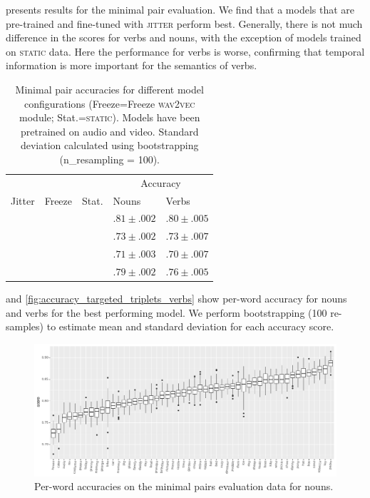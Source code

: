 presents results for the minimal pair 
evaluation. We find that a models that are 
pre-trained and fine-tuned with \textsc{jitter} perform best. Generally, there 
is not much difference in the scores for verbs and nouns, with the exception of 
models trained on \textsc{static} data. Here the performance for verbs is 
worse, confirming that temporal information is more important for the semantics 
of verbs.
\begin{table}[htb]
	\centering
	\begin{tabular}{lllll}
		\toprule
		& & & \multicolumn{2}{c}{Accuracy} \\
		Jitter & Freeze & Stat. & Nouns & Verbs \\
		\midrule
		\checkmark &  &  & $.81 \pm .002$  & $.80 \pm .005$ \\
		 &  &  & $.73 \pm .002$ & $.73 \pm .007$  \\
		\checkmark & \checkmark &  & $.71 \pm .003$ & $.70 \pm .007$ \\
		\checkmark &  &  \checkmark & $.79 \pm .002$ & $.76 \pm .005$ \\
		\bottomrule
	\end{tabular}
	\caption{Minimal pair accuracies for different model configurations 
	(Freeze=Freeze \textsc{wav2vec} module; Stat.=\textsc{static}). Models 
	have been pretrained on audio and video. Standard deviation calculated 
	using bootstrapping (n\_resampling = 100).}
	\label{tab:minimal_pair_results}
\end{table}

 and
\ref{fig:accuracy_targeted_triplets_verbs} show per-word
accuracy for nouns and verbs for the best performing model.
We perform bootstrapping (100 re-samples) to estimate mean and standard 
deviation for each accuracy score.


\begin{figure}[htb]
  \centering
  \includegraphics[width=\textwidth]{results/targeted_triplets/results_per_word_version_335_NOUN.pdf}
  \caption{Per-word accuracies on the minimal pairs evaluation data for nouns.}
  \label{fig:accuracy_targeted_triplets_nouns}
\end{figure}

